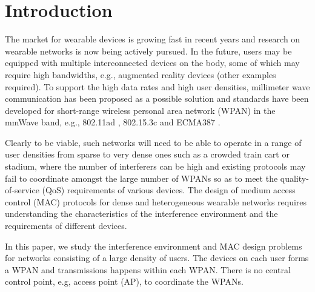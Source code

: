 \documentclass[10pt, conference, letterpaper]{IEEEtran}
\begin{document}
\section{Introduction}\label{section:introduction}

The market for wearable devices is growing fast in recent years \cite{wearable} and research on wearable networks is now being actively pursued. In the future, users may be equipped with multiple interconnected devices on the body, some of which may require high bandwidths, e.g., augmented reality devices (other examples required). To support the high data rates and high user densities, millimeter wave communication has been proposed as a possible solution and standards have been developed for short-range wireless personal area network (WPAN) in the mmWave band, e.g., 802.11ad \cite{80211ad}, 802.15.3c \cite{802153c} and ECMA387 \cite{ECMA387}. 

Clearly to be viable, such networks will need to be able to operate in a range of user densities from sparse to very dense ones such as a crowded train cart or stadium, where the number of interferers can be high and existing protocols may fail to coordinate amongst the large number of WPANs so as to meet the quality-of-service (QoS) requirements of various devices. The design of medium access control (MAC) protocols for dense and heterogeneous wearable networks requires understanding the characteristics of the interference environment and the requirements of different devices.

In this paper, we study the interference environment and MAC design problems for networks consisting of a large density of users. The devices on each user forms a WPAN and transmissions happens within each WPAN. There is no central control point, e.g, access point (AP), to coordinate the WPANs. 
\end{document}
